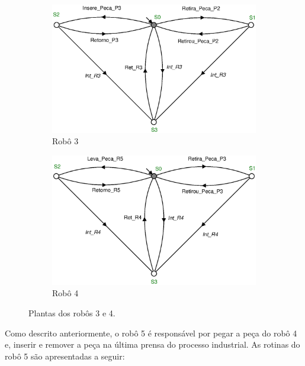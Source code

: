 \begin{figure}[H]%
	\centering
	\begin{subfigure}[b]{0.45\textwidth}
		\centering
		\includegraphics[width=\textwidth]{imagens/Robo_3.eps}
		\caption{Robô 3}
		\label{fig:robo3}
	\end{subfigure}
	\hfill
	\begin{subfigure}[b]{0.45\textwidth}
		\centering
		\includegraphics[width=\textwidth]{imagens/Robo_4.eps}
		\caption{Robô 4}
		\label{fig:robo4}
	\end{subfigure}
	\caption{Plantas dos robôs 3 e 4.}
	\label{fig:robo34}
\end{figure}

Como descrito anteriormente, o robô 5 é responsável por pegar a peça do robô 4 e, inserir e remover a peça na última prensa do processo industrial. As rotinas do robô 5 são apresentadas a seguir:

